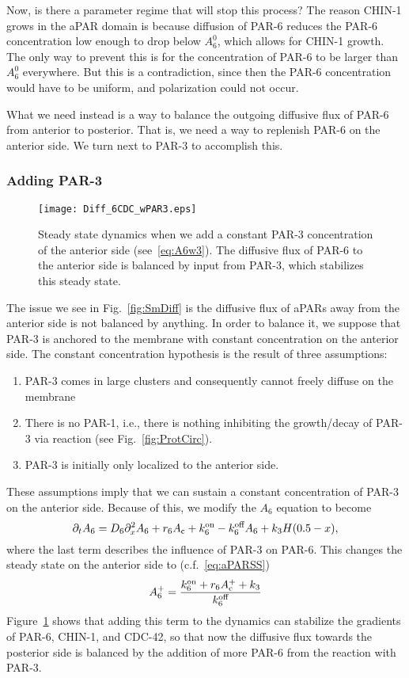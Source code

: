 \documentclass[11pt]{article}
\newcommand{\CDC}[1]{#1_{\text{c}}}
\newcommand{\6}[1]{#1_{\text{6}}}
\newcommand{\3}[1]{#1_{\text{3}}}
\begin{document}
Now, is there a parameter regime that will stop this process? The reason CHIN-1 grows in the aPAR domain is because diffusion of PAR-6 reduces the PAR-6 concentration low enough to drop below $\6{A}^0$, which allows for CHIN-1 growth. The only way to prevent this is for the concentration of PAR-6 to be larger than $\6{A}^0$ everywhere. But this is a contradiction, since then the PAR-6 concentration would have to be uniform, and polarization could not occur. 

What we need instead is a way to balance the outgoing diffusive flux of PAR-6 from anterior to posterior. That is, we need a way to replenish PAR-6 on the anterior side. We turn next to PAR-3 to accomplish this.

\subsubsection{Adding PAR-3}
\begin{figure}
\centering
\texttt{[image: Diff\_6CDC\_wPAR3.eps]}
\caption{\label{fig:SmDiffW3} Steady state dynamics when we add a constant PAR-3 concentration of the anterior side (see\ \eqref{eq:A6w3}). The diffusive flux of PAR-6 to the anterior side is balanced by input from PAR-3, which stabilizes this steady state.}
\end{figure}

The issue we see in Fig.\ \ref{fig:SmDiff} is the diffusive flux of aPARs away from the anterior side is not balanced by anything. In order to balance it, we suppose that PAR-3 is anchored to the membrane with constant concentration on the anterior side. The constant concentration hypothesis is the result of three assumptions: 
\begin{enumerate}
\item PAR-3 comes in large clusters and consequently cannot freely diffuse on the membrane
\item There is no PAR-1, i.e., there is nothing inhibiting the growth/decay of PAR-3 via reaction (see Fig.\ \ref{fig:ProtCirc}). 
\item PAR-3 is initially only localized to the anterior side.
\end{enumerate}
These assumptions imply that we can sustain a constant concentration of PAR-3 on the anterior side. Because of this, we modify the $\6{A}$ equation to become
\begin{equation}
\label{eq:A6w3}
\Dt \6{A} = \6{D} \Dx^2 \6{A} + \6{r} \CDC{A}+\6{\kon}-\6{\koff}\6{A}+\3{k}H(0.5-x),
\end{equation}
where the last term describes the influence of PAR-3 on PAR-6. This changes the steady state on the anterior side to (c.f.\ \eqref{eq:aPARSS})
\begin{equation}
 \6{A}^+ = \frac{\6{\kon}+\6{r}\CDC{A}^++\3{k}}{\6{\koff}}
\end{equation}
Figure\ \ref{fig:SmDiffW3} shows that adding this term to the dynamics can stabilize the gradients of PAR-6, CHIN-1, and CDC-42, so that now the diffusive flux towards the posterior side is balanced by the addition of more PAR-6 from the reaction with PAR-3. 
\end{document}
